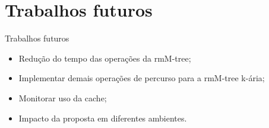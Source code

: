 \section{Trabalhos futuros}

\begin{frame}{Trabalhos futuros}
    \begin{itemize}
        \item Redução do tempo das operações da rmM-tree;
        \item Implementar demais operações de percurso para a rmM-tree k-ária;
        \item Monitorar uso da cache;
        \item Impacto da proposta em diferentes ambientes.
    \end{itemize}
\end{frame}

